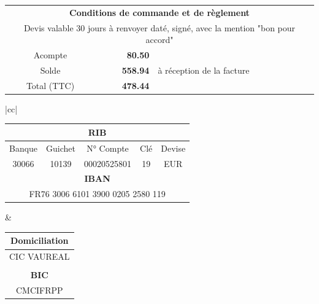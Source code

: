 \documentclass[11pt,french]{article}%
\def\Total{558.94}%
\def\totalLeft{478.44}%
\def\deposit{80.50}%
\begin{document}
\vfill
\vfill
\begin{center}
\begin{tabular}{|crl|}
	\hline
	\multicolumn{3}{|c|}{\textbf{Conditions de commande et de règlement}} \\
	\multicolumn{3}{|c|}{Devis valable 30 jours à renvoyer daté, signé, avec la mention "bon pour accord"} \\
	Acompte & \textbf{\deposit \EUR} & \\
	Solde &	\textbf{\Total \EUR} & à réception de la facture \\
	Total (TTC) & \textbf{\totalLeft \EUR} & \\
	\hline
\end{tabular}
\begin{tabular}{|cc|}
	\hline
	\begin{minipage}{10cm}
	\begin{center}
		\begin{tabular}{ccccc}
		 	\multicolumn{5}{c}{\textbf{RIB}} \\
		 	\hline
			Banque & Guichet & N° Compte & Clé & Devise \\
			30066  & 10139 & 00020525801 & 19 & EUR \\ 
			\multicolumn{5}{c}{\textbf{IBAN}} \\
			\hline
			\multicolumn{5}{c}{FR76 3006 6101 3900 0205 2580 119}
		\end{tabular}
	\end{center}
	\end{minipage} &
	\begin{minipage}{7cm}
	\begin{center}
	\begin{tabular}{c}
		\textbf{Domiciliation} \\ \hline
		CIC VAUREAL \\
		\\
		\textbf{BIC} \\ \hline
		CMCIFRPP
	\end{tabular}
	\end{center}
	\end{minipage} \\ \hline \hline


\end{tabular}
\end{center}
\end{document}
